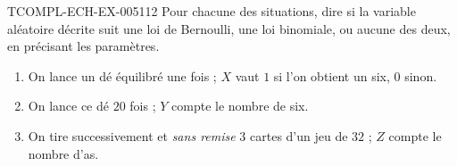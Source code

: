 \begin{exercice}{TCOMPL-ECH-EX-005}{1}{12}
Pour chacune des situations, dire si la variable aléatoire décrite suit une
loi de Bernoulli, une loi binomiale, ou aucune des deux, en précisant les
paramètres.
\begin{enumerate}
  \item On lance un dé équilibré une fois ; $X$ vaut $1$ si l'on obtient un
        six, $0$ sinon.
  \item On lance ce dé $20$ fois ; $Y$ compte le nombre de six.
  \item On tire successivement et \emph{sans remise} $3$ cartes d'un jeu de
        $32$ ; $Z$ compte le nombre d'as.
\end{enumerate}
\end{exercice}
